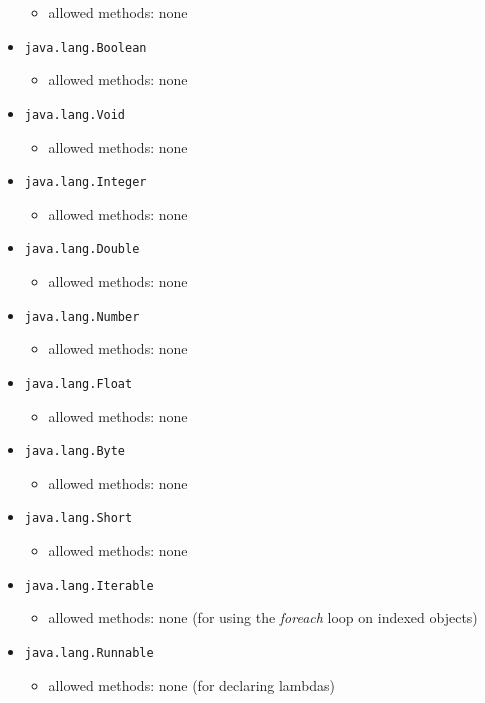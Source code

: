 \documentclass[a4paper]{report}
\begin{document}
\begin{itemize}
\begin{itemize}
	\item allowed methods: none
	\end{itemize}
\item \texttt{java.lang.Boolean}
	\begin{itemize}
	\item allowed methods: none
	\end{itemize}
\item \texttt{java.lang.Void}
	\begin{itemize}
	\item allowed methods: none
	\end{itemize}
\item \texttt{java.lang.Integer}
	\begin{itemize}
	\item allowed methods: none
	\end{itemize}
\item \texttt{java.lang.Double}
	\begin{itemize}
	\item allowed methods: none
	\end{itemize}
\item \texttt{java.lang.Number}
	\begin{itemize}
	\item allowed methods: none
	\end{itemize}
\item \texttt{java.lang.Float}
	\begin{itemize}
	\item allowed methods: none
	\end{itemize}
\item \texttt{java.lang.Byte}
	\begin{itemize}
	\item allowed methods: none
	\end{itemize}
\item \texttt{java.lang.Short}
	\begin{itemize}
	\item allowed methods: none
	\end{itemize}
\item \texttt{java.lang.Iterable}
	\begin{itemize}
	\item allowed methods: none (for using the \emph{foreach} loop on indexed objects)
	\end{itemize}
\item \texttt{java.lang.Runnable}
	\begin{itemize}
	\item allowed methods: none (for declaring lambdas)

\end{itemize}
\end{itemize}
\end{document}
